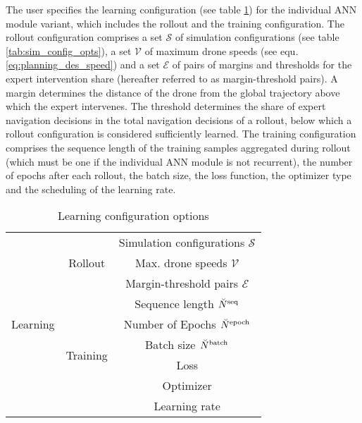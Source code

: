 The user specifies the learning configuration (see table \ref{tab:learn_config})
for the individual ANN module variant, 
which includes the rollout and the training configuration.
The rollout configuration comprises 
a set $\mathcal{S}$ of simulation configurations 
(see table \ref{tab:sim_config_opts}),
a set $\mathcal{V}$ of maximum drone speeds 
(see equ. \ref{eq:planning_des_speed})
and a set $\mathcal{E}$ of pairs of 
margins and thresholds for the expert intervention share
(hereafter referred to as margin-threshold pairs).
A margin determines the
distance of the drone from the global trajectory
above which the expert intervenes.
The threshold determines 
the share of expert navigation decisions 
in the total navigation decisions of a rollout, 
below which a rollout configuration is considered sufficiently learned.
The training configuration comprises 
the sequence length of the training samples aggregated during rollout
(which must be one if the individual ANN module is not recurrent),
the number of epochs after each rollout,
the batch size,
the loss function,
the optimizer type and the scheduling of the learning rate.
\begin{table}[h]
    \caption{Learning configuration options
    \label{tab:learn_config}}
    \centering
    \begin{tabular}{|c|c|c|} 
        \hline
        \multirow{9}{*}{Learning} 
        &\multirow{3}{*}{Rollout}   
        &Simulation configurations $\mathcal{S}$
        \\\cline{3-3}
        &
        &Max. drone speeds $\mathcal{V}$
        \\\cline{3-3}
        &
        &Margin-threshold pairs $\mathcal{E}$
        \\\cline{2-3}
        &\multirow{6}{*}{Training}   
        &Sequence length $\seqLen$
        \\\cline{3-3}
        &
        &Number of Epochs $\num[\user]{\text{epoch}}{}{}{}$
        \\\cline{3-3}
        &
        &Batch size $\batchSize$
        \\\cline{3-3}
        &
        &Loss
        \\\cline{3-3}
        &
        &Optimizer
        \\\cline{3-3}
        &
        &Learning rate
        \\\hline
    \end{tabular}
\end{table}


